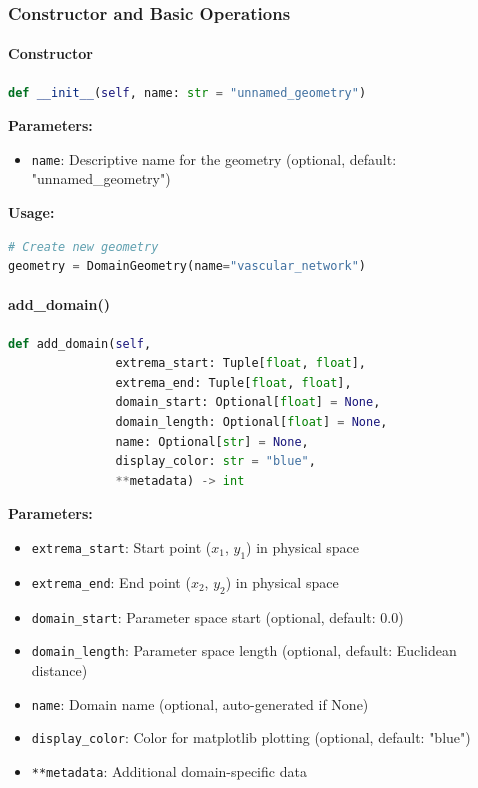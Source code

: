 \subsubsection{Constructor and Basic Operations}

\paragraph{Constructor}
\begin{lstlisting}[language=Python, caption=DomainGeometry Constructor]
def __init__(self, name: str = "unnamed_geometry")
\end{lstlisting}

\textbf{Parameters:}
\begin{itemize}
    \item \texttt{name}: Descriptive name for the geometry (optional, default: "unnamed\_geometry")
\end{itemize}

\textbf{Usage:}
\begin{lstlisting}[language=Python]
# Create new geometry
geometry = DomainGeometry(name="vascular_network")
\end{lstlisting}

\paragraph{add\_domain()}\leavevmode
\begin{lstlisting}[language=Python, caption=Add Domain Method]
def add_domain(self, 
               extrema_start: Tuple[float, float],
               extrema_end: Tuple[float, float],
               domain_start: Optional[float] = None,
               domain_length: Optional[float] = None,
               name: Optional[str] = None,
               display_color: str = "blue",
               **metadata) -> int
\end{lstlisting}

\textbf{Parameters:}
\begin{itemize}
    \item \texttt{extrema\_start}: Start point ($x_1$, $y_1$) in physical space
    \item \texttt{extrema\_end}: End point ($x_2$, $y_2$) in physical space
    \item \texttt{domain\_start}: Parameter space start (optional, default: 0.0)
    \item \texttt{domain\_length}: Parameter space length (optional, default: Euclidean distance)
    \item \texttt{name}: Domain name (optional, auto-generated if None)
    \item \texttt{display\_color}: Color for matplotlib plotting (optional, default: "blue")
    \item \texttt{**metadata}: Additional domain-specific data
\end{itemize}

